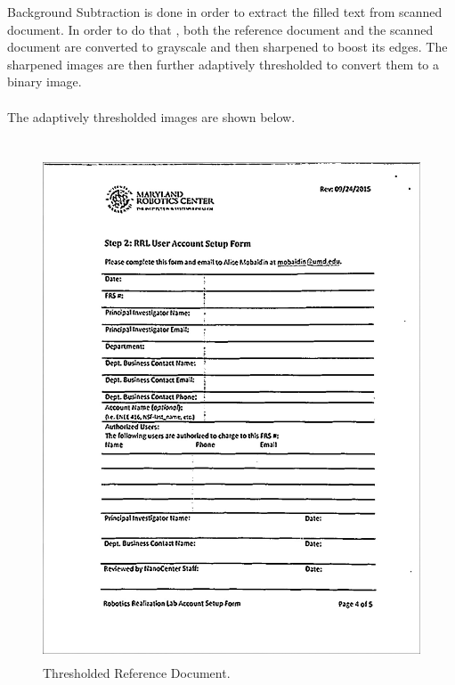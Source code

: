 Background Subtraction is done in order to extract the filled text from scanned document. In order to do that , both the reference document and the scanned document are converted to grayscale and then sharpened to boost its edges. The sharpened images are then further adaptively thresholded to convert them to a binary image.
\\
\\
The adaptively thresholded images are shown below.
\\
\\
\begin{figure}[th]
	\centering
	\includegraphics[height=15cm ]{Figures/thresholded_reference_image}
	\caption[Thresholded Reference Document]{Thresholded Reference Document.}
	\label{fig:ThresholdedReferenceDocument}
\end{figure}	

\pagebreak

